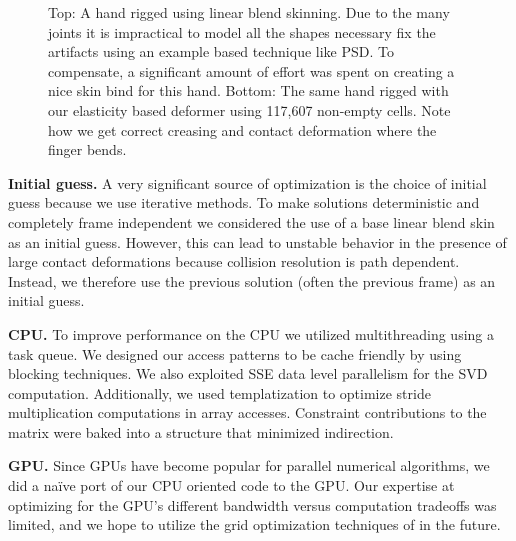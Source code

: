 \begin{figure}[tb]
\caption{Top: A hand rigged using linear blend skinning. Due to the many joints
it is impractical to model all the shapes necessary fix the artifacts using an
example based technique like PSD. To compensate, a significant amount of effort was
spent on creating a nice skin bind for this hand. Bottom: The same hand rigged with our
elasticity based deformer using 117,607 non-empty cells. Note how we get correct creasing and contact
deformation where the finger bends.}
\label{fig:hand}
\end{figure}


\textbf{Initial guess.} A very significant source of optimization is the choice of initial guess because
we use iterative methods.  To make solutions deterministic and completely frame
independent we considered the use of a base linear blend skin as an initial
guess. However, this can lead to unstable behavior in the presence of large
contact deformations because collision resolution is path dependent. Instead, we therefore use the previous
solution (often the previous frame) as an initial guess. 

\textbf{CPU.} To improve performance on the CPU we utilized multithreading using a task
queue. We designed our access patterns to be cache friendly by using blocking
techniques.  We also exploited SSE data level parallelism for the SVD
computation. Additionally, we used templatization to optimize stride
multiplication computations in array accesses. Constraint contributions to the
matrix were baked into a structure that minimized indirection.

\textbf{GPU.} Since GPUs have become popular for parallel numerical algorithms, we did a
na\"{i}ve port of our CPU oriented code to the GPU. Our expertise at optimizing
for the GPU's different bandwidth versus computation tradeoffs was limited, and
we hope to utilize the grid optimization techniques of \cite{Dick:2011:CUDAFEM}
in the future.

